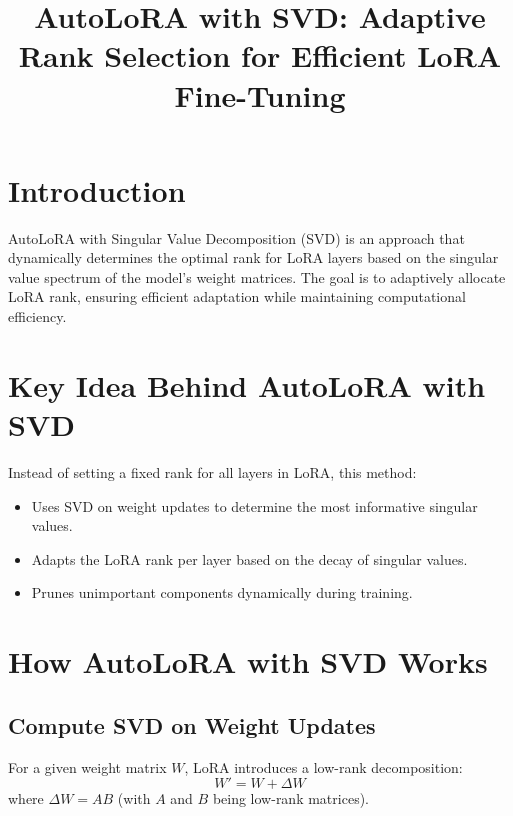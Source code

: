 \documentclass{article}
\begin{document}
\title{AutoLoRA with SVD: Adaptive Rank Selection for Efficient LoRA Fine-Tuning}
\author{}
\date{}
\maketitle

\section{Introduction}
AutoLoRA with Singular Value Decomposition (SVD) is an approach that dynamically determines the optimal rank for LoRA layers based on the singular value spectrum of the model's weight matrices. The goal is to adaptively allocate LoRA rank, ensuring efficient adaptation while maintaining computational efficiency.

\section{Key Idea Behind AutoLoRA with SVD}
Instead of setting a fixed rank for all layers in LoRA, this method:
\begin{itemize}
    \item Uses SVD on weight updates to determine the most informative singular values.
    \item Adapts the LoRA rank per layer based on the decay of singular values.
    \item Prunes unimportant components dynamically during training.
\end{itemize}

\section{How AutoLoRA with SVD Works}
\subsection{Compute SVD on Weight Updates}
For a given weight matrix $W$, LoRA introduces a low-rank decomposition:
\begin{equation}
    W' = W + \Delta W
\end{equation}
where $\Delta W = AB$ (with $A$ and $B$ being low-rank matrices).
\end{document}
